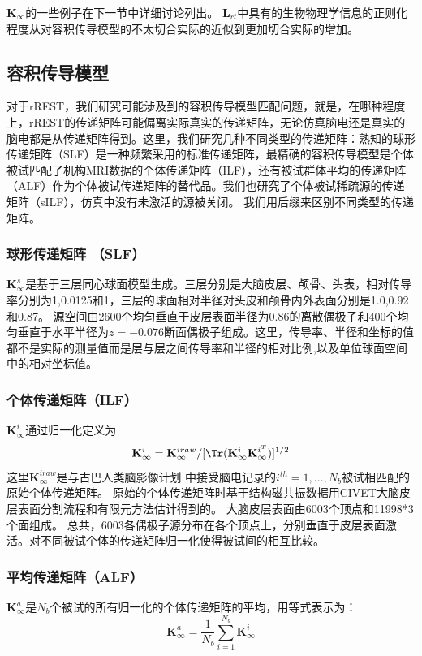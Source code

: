 $\mathbf{K}_{\infty}$的一些例子在下一节中详细讨论列出。 $\mathbf{L}_{rt}$中具有的生物物理学信息的正则化程度从对容积传导模型的不太切合实际的近似到更加切合实际的增加。
\subsection{容积传导模型}
对于rREST，我们研究可能涉及到的容积传导模型匹配问题，就是，在哪种程度上，rREST的传递矩阵可能偏离实际真实的传递矩阵，无论仿真脑电还是真实的脑电都是从传递矩阵得到。这里，我们研究几种不同类型的传递矩阵：熟知的球形传递矩阵（SLF）是一种频繁采用的标准传递矩阵，最精确的容积传导模型是个体被试匹配了机构MRI数据的个体传递矩阵（ILF），还有被试群体平均的传递矩阵（ALF）作为个体被试传递矩阵的替代品。我们也研究了个体被试稀疏源的传递矩阵（sILF），仿真中没有未激活的源被关闭。 我们用后缀来区别不同类型的传递矩阵。
\subsubsection{球形传递矩阵 （SLF）}
$\mathbf{K}_{\infty}^{s}$是基于三层同心球面模型生成。三层分别是大脑皮层、颅骨、头表，相对传导率分别为1,0.0125和1，三层的球面相对半径对头皮和颅骨内外表面分别是1.0,0.92和0.87。 源空间由2600个均匀垂直于皮层表面半径为0.86的离散偶极子和400个均匀垂直于水平半径为$z=-0.076$断面偶极子组成。这里，传导率、半径和坐标的值都不是实际的测量值而是层与层之间传导率和半径的相对比例,以及单位球面空间中的相对坐标值。
\subsubsection{个体传递矩阵（ILF）}
$\mathbf{K}_{\infty}^i$通过归一化定义为
\begin{equation*}
\mathbf{K}_\infty^i=\mathbf{K}_\infty^{iraw}/{[\Tr(\mathbf{K}_\infty^i\mathbf{K}_\infty^{i^T})]^{1/2}}
\end{equation*}
这里$\mathbf{K}_{\infty}^{iraw}$是与古巴人类脑影像计划
中接受脑电记录的$i^{th}=1,...,N_b$被试相匹配的原始个体传递矩阵。 
原始的个体传递矩阵时基于结构磁共振数据用CIVET大脑皮层表面分割流程和有限元方法估计得到的。 大脑皮层表面由6003个顶点和11998*3个面组成。 总共，6003各偶极子源分布在各个顶点上，分别垂直于皮层表面激活。对不同被试个体的传递矩阵归一化使得被试间的相互比较。

\subsubsection{平均传递矩阵（ALF）}
$\mathbf{K}_{\infty}^a$是$N_b$个被试的所有归一化的个体传递矩阵的平均，用等式表示为：
\begin{equation*}
\mathbf{K}_{\infty}^a=\frac{1}{N_b}\sum_{i=1}^{N_b}\mathbf{K}_{\infty}^i
\end{equation*}

